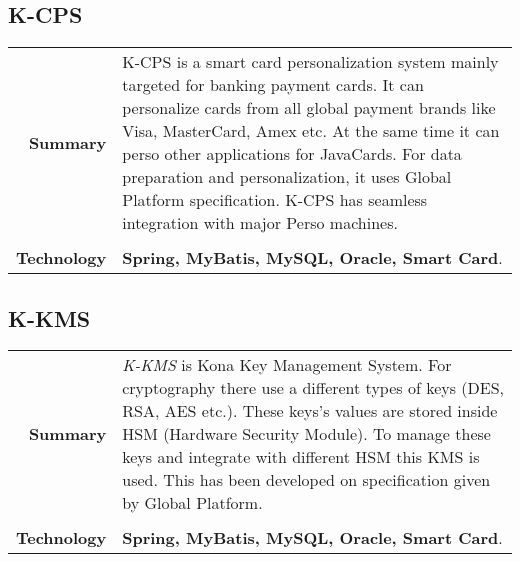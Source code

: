 \documentclass[a4paper,10pt]{article}
\begin{document}
\subsection*{K-CPS}
\begin{tabular}{r|p{13cm}}
\textbf{Summary}&K-CPS is a smart card personalization system mainly targeted for banking payment cards. It can personalize cards from all global payment brands like Visa, MasterCard, Amex etc. At the same time it can perso other applications for JavaCards. For data preparation and personalization, it uses Global Platform specification. K-CPS has seamless integration with major Perso machines.\\\\
\textbf{Technology}& \textbf{Spring, MyBatis, MySQL, Oracle, Smart Card}.
\end{tabular}

\subsection*{K-KMS}
\begin{tabular}{r|p{13cm}}
\textbf{Summary}&\emph{K-KMS} is Kona Key Management System. For cryptography there use a different types of keys (DES, RSA, AES etc.). These keys's values are stored inside HSM (Hardware Security Module). To manage these keys and integrate with different HSM this KMS is used. This has been developed on specification given by Global Platform.\\\\
\textbf{Technology}& \textbf{Spring, MyBatis, MySQL, Oracle, Smart Card}.
\end{tabular}

\bigskip
\bigskip
\end{document}
